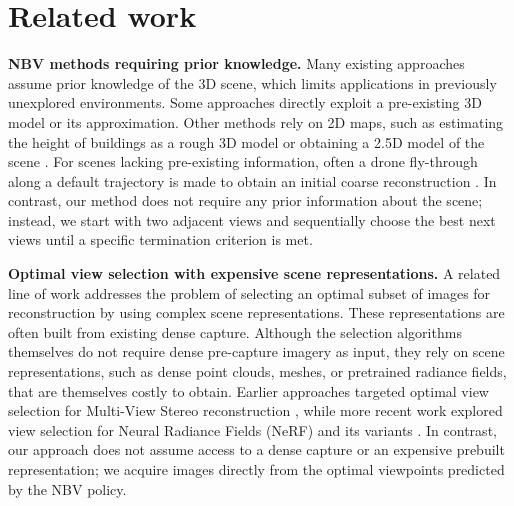 \section{Related work}
\label{sec:related_work}
\vspace{-0.25em}

\noindent\textbf{NBV methods requiring prior knowledge.} Many existing approaches assume prior knowledge of the 3D scene, which limits applications in previously unexplored environments. Some approaches \cite{devrim2017reinforcement, sun2021learning, zhang2021continuous} directly exploit a pre-existing 3D model or its approximation. Other methods rely on 2D maps, such as estimating the height of buildings as a rough 3D model \cite{jing2016view} or obtaining a 2.5D model of the scene \cite{zhou2020offsite}.
For scenes lacking pre-existing information, often a drone fly-through along a default trajectory is made to obtain an initial coarse reconstruction \cite{roberts2017submodular,hepp2018plan3d}. In contrast, our method does not require any prior information about the scene; instead, we start with two adjacent views and sequentially choose the best next views until a specific termination criterion is met. 

\noindent\textbf{Optimal view selection with expensive scene representations.}
A related line of work addresses the problem of selecting an optimal subset of images for reconstruction by using complex scene representations. These representations are often built from existing dense capture. Although the selection algorithms themselves do not require dense pre-capture imagery as input, they rely on scene representations, such as dense point clouds, meshes, or pretrained radiance fields, that are themselves costly to obtain. Earlier approaches targeted optimal view selection for Multi-View Stereo reconstruction \citep{hornung2008image, furukawa2010towards}, while more recent work explored view selection for Neural Radiance Fields (NeRF) and its variants \citep{smith2022uncertainty, pan2022activenerf, lee2023so, jiang2023fisherrf}. In contrast, our approach does not assume access to a dense capture or an expensive prebuilt representation; we acquire images directly from the optimal viewpoints predicted by the NBV policy.

